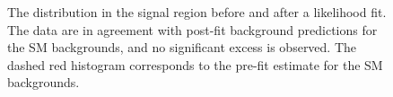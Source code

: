 \begin{figure}
\centering
\caption{The \MET distribution in the signal region before and after a likelihood fit. The data are in agreement with post-fit background predictions for the SM backgrounds, and no significant excess is observed. The dashed red histogram corresponds to the pre-fit estimate for the SM backgrounds.}
\label{Fig_sr}
\end{figure}

